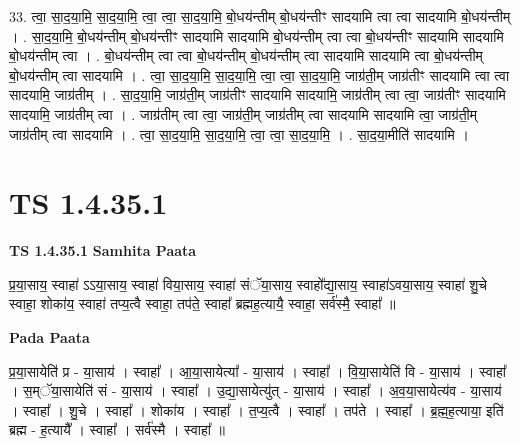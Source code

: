 \documentclass[17pt]{extarticle}
\begin{document}
33. त्वा॒ सा॒द॒या॒मि॒ सा॒द॒या॒मि॒ त्वा॒ त्वा॒ सा॒द॒या॒मि॒ बो॒धय॑न्तीम् बो॒धय॑न्तीꣳ सादयामि त्वा त्वा सादयामि बो॒धय॑न्तीम् । . सा॒द॒या॒मि॒ बो॒धय॑न्तीम् बो॒धय॑न्तीꣳ सादयामि सादयामि बो॒धय॑न्तीम् त्वा त्वा बो॒धय॑न्तीꣳ सादयामि सादयामि बो॒धय॑न्तीम् त्वा । . बो॒धय॑न्तीम् त्वा त्वा बो॒धय॑न्तीम् बो॒धय॑न्तीम् त्वा सादयामि सादयामि त्वा बो॒धय॑न्तीम् बो॒धय॑न्तीम् त्वा सादयामि । . त्वा॒ सा॒द॒या॒मि॒ सा॒द॒या॒मि॒ त्वा॒ त्वा॒ सा॒द॒या॒मि॒ जाग्र॑ती॒म् जाग्र॑तीꣳ सादयामि त्वा त्वा सादयामि॒ जाग्र॑तीम् । . सा॒द॒या॒मि॒ जाग्र॑ती॒म् जाग्र॑तीꣳ सादयामि सादयामि॒ जाग्र॑तीम् त्वा त्वा॒ जाग्र॑तीꣳ सादयामि सादयामि॒ जाग्र॑तीम् त्वा । . जाग्र॑तीम् त्वा त्वा॒ जाग्र॑ती॒म् जाग्र॑तीम् त्वा सादयामि सादयामि त्वा॒ जाग्र॑ती॒म् जाग्र॑तीम् त्वा सादयामि । . त्वा॒ सा॒द॒या॒मि॒ सा॒द॒या॒मि॒ त्वा॒ त्वा॒ सा॒द॒या॒मि॒ । . सा॒द॒या॒मीति॑ सादयामि । \newline
\pagebreak
{}

\section{ TS 1.4.35.1 }

\textbf{TS 1.4.35.1 } \newline
\textbf{Samhita Paata} \newline

प्र॒या॒साय॒ स्वाहा॑ ऽऽया॒साय॒ स्वाहा॑ विया॒साय॒ स्वाहा॑ संॅया॒साय॒ स्वाहो᳚द्या॒साय॒ स्वाहा॑ऽवया॒साय॒ स्वाहा॑ शु॒चे स्वाहा॒ शोका॑य॒ स्वाहा॑ तप्य॒त्वै स्वाहा॒ तप॑ते॒ स्वाहा᳚ ब्रह्मह॒त्यायै॒ स्वाहा॒ सर्व॑स्मै॒ स्वाहा᳚ ॥ \newline

\textbf{Pada Paata} \newline

प्र॒या॒सायेति॑ प्र - या॒साय॑ । स्वाहा᳚ । आ॒या॒सायेत्या᳚ - या॒साय॑ । स्वाहा᳚ । वि॒या॒सायेति॑ वि - या॒साय॑ । स्वाहा᳚ । स॒म्ॅया॒सायेति॑ सं - या॒साय॑ । स्वाहा᳚ । उ॒द्या॒सायेत्यु॑त् - या॒साय॑ । स्वाहा᳚ । अ॒व॒या॒सायेत्य॑व - या॒साय॑ । स्वाहा᳚ । शु॒चे । स्वाहा᳚ । शोका॑य । स्वाहा᳚ । त॒प्य॒त्वै । स्वाहा᳚ । तप॑ते । स्वाहा᳚ । ब्र॒ह्म॒ह॒त्याया॒ इति॑ ब्रह्म - ह॒त्यायै᳚ । स्वाहा᳚ । सर्व॑स्मै । स्वाहा᳚ ॥  \newline
\end{document}
